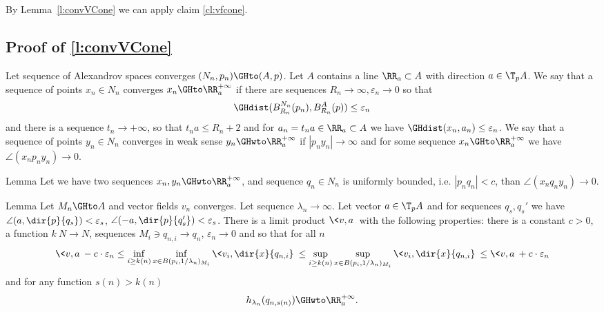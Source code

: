  By Lemma~\ref{l:convVCone} we can apply claim \ref{cl:vfcone}.
\qeds




\subsection{Proof of \ref{l:convVCone}}

Let sequence of Alexandrov spaces converges
$(N_n,p_n)\GHto (A,p)$.
 Let $A$ contains a line $\RR_a\subset A$
 with direction
$a\in \T_p A$.
We say that a sequence of points  $x_n\in N_n$
converges $x_n\GHto\RR_a^{+\infty}$ if
there are sequences $R_n\to\infty,\varepsilon_n\to 0$
so that
$$\GHdist(B^{N_n}_{R_n}(p_n), B^{A}_{R_n}(p))\le\varepsilon_n$$
and there is a sequence $t_n\to+\infty$,
so that
$t_n a\le R_n+2$ and
 for $a_n=t_n a\in \RR_a\subset A$
we have
$\GHdist(x_n,a_n)\le\varepsilon_n$.
We say that a sequence of points  $y_n\in N_n$
converges in weak sense $y_n\GHwto\RR_a^{+\infty}$ if
$|p_n y_n|\to \infty$ and
for some sequence
$x_n\GHto\RR_a^{+\infty}$ we have $\angle (x_n p_n y_n)\to 0$.

\begin{thm}{Lemma}\label{lem:angle}
Let we have two sequences $x_n, y_n\GHwto\RR_a^{+\infty}$,
and  sequence $q_n\in N_n$ is uniformly bounded, i.e. $|p_n q_n|<c$,
than $\angle (x_n q_n y_n)\to 0$.
\end{thm}




\begin{thm}{Lemma} \label{lem:vconvergLoc}
Let $M_n\GHto A$ and vector fields $v_n$ converges.
Let sequence $\lambda_n\to\infty$.
Let vector $a\in \T_p A$
and for sequences $q_s, q_s'$
we have $\angle (a,\dir{p}{q_s})<\varepsilon_s$,
 $\angle (-a,\dir{p}{q'_s})<\varepsilon_s$.
There is a  limit product $\<v,a\>$
with the following properties:
there is a constant $c>0$,
a function $k\: N\to N$,
 sequences
$M_i\ni q_{n,i}\to q_n$, $\varepsilon_n\to 0$
and
so that for   all $n$
$$\<v,a\>- c\cdot \varepsilon_n
\le
\inf_{i\ge k(n)}\inf_{x\in B(p_i,1/\lambda_n)_{M_i}} \< v_i,\dir{x}{q_{n,i}}\>
\le
\sup_{i\ge k(n)}\sup_{x\in B(p_i,1/\lambda_n)_{M_i}}  \< v_i,\dir{x}{q_{n,i}}\>\le
\<v,a\>+
 c\cdot \varepsilon_n$$
and for any function $s(n)>k(n)$
$$h_{\lambda_n}( q_{n,s(n)})\GHwto\RR_a^{+\infty}.$$

\end{thm}

